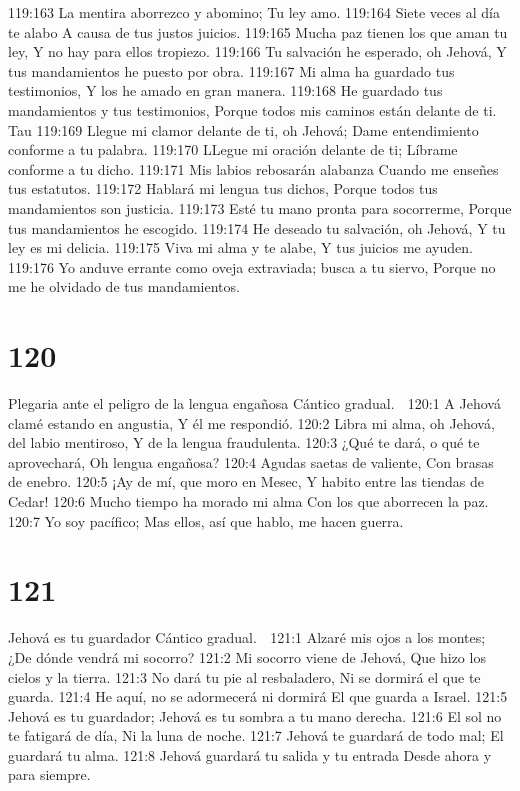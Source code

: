 119:163 La mentira aborrezco y abomino; 
Tu ley amo. 
119:164 Siete veces al día te alabo 
A causa de tus justos juicios. 
119:165 Mucha paz tienen los que aman tu ley, 
Y no hay para ellos tropiezo. 
119:166 Tu salvación he esperado, oh Jehová, 
Y tus mandamientos he puesto por obra. 
119:167 Mi alma ha guardado tus testimonios, 
Y los he amado en gran manera. 
119:168 He guardado tus mandamientos y tus testimonios, 
Porque todos mis caminos están delante de ti. 
Tau 
119:169 Llegue mi clamor delante de ti, oh Jehová; 
Dame entendimiento conforme a tu palabra. 
119:170 LLegue mi oración delante de ti; 
Líbrame conforme a tu dicho. 
119:171 Mis labios rebosarán alabanza 
Cuando me enseñes tus estatutos. 
119:172 Hablará mi lengua tus dichos, 
Porque todos tus mandamientos son justicia. 
119:173 Esté tu mano pronta para socorrerme, 
Porque tus mandamientos he escogido. 
119:174 He deseado tu salvación, oh Jehová, 
Y tu ley es mi delicia. 
119:175 Viva mi alma y te alabe, 
Y tus juicios me ayuden. 
119:176 Yo anduve errante como oveja extraviada; busca a tu siervo, 
Porque no me he olvidado de tus mandamientos. 

\chapter{120}

Plegaria ante el peligro de la lengua engañosa 
Cántico gradual. 

120:1 A Jehová clamé estando en angustia, 
Y él me respondió. 
120:2 Libra mi alma, oh Jehová, del labio mentiroso, 
Y de la lengua fraudulenta. 
120:3 ¿Qué te dará, o qué te aprovechará, 
Oh lengua engañosa? 
120:4 Agudas saetas de valiente, 
Con brasas de enebro. 
120:5 ¡Ay de mí, que moro en Mesec, 
Y habito entre las tiendas de Cedar! 
120:6 Mucho tiempo ha morado mi alma 
Con los que aborrecen la paz. 
120:7 Yo soy pacífico; 
Mas ellos, así que hablo, me hacen guerra. 

\chapter{121}

Jehová es tu guardador 
Cántico gradual. 

121:1 Alzaré mis ojos a los montes; 
¿De dónde vendrá mi socorro? 
121:2 Mi socorro viene de Jehová, 
Que hizo los cielos y la tierra. 
121:3 No dará tu pie al resbaladero, 
Ni se dormirá el que te guarda. 
121:4 He aquí, no se adormecerá ni dormirá 
El que guarda a Israel. 
121:5 Jehová es tu guardador; 
Jehová es tu sombra a tu mano derecha. 
121:6 El sol no te fatigará de día, 
Ni la luna de noche. 
121:7 Jehová te guardará de todo mal; 
El guardará tu alma. 
121:8 Jehová guardará tu salida y tu entrada 
Desde ahora y para siempre. 


